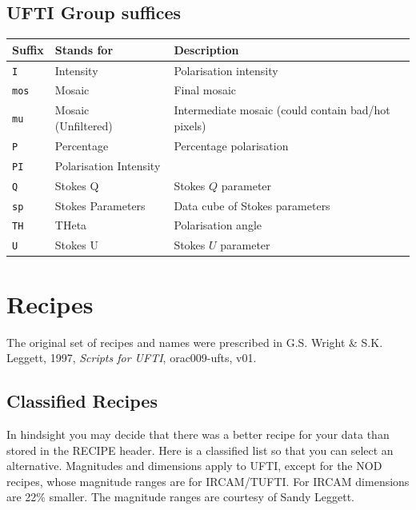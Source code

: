 \documentclass[twoside,11pt]{article}
\newcommand{\htmladdnormallink}[2]{#1}
\newcommand{\xlabel}[1]{}
\renewcommand{\_}{\texttt{\symbol{95}}}
\begin{document}
\subsection*{UFTI Group suffices}%
\begin{tabular}{llp{80mm}}
\hline
  Suffix   & Stands for             & Description \\ \hline
{\tt\_I}   & Intensity              & Polarisation intensity \\
{\tt\_mos} & Mosaic                 & Final mosaic \\
{\tt\_mu}  & Mosaic (Unfiltered)~~~ & Intermediate mosaic (could contain
                                      bad/hot pixels) \\
{\tt\_P}   & Percentage             & Percentage polarisation \\
{\tt\_PI}  & Polarisation Intensity & \\
{\tt\_Q}   & Stokes Q               & Stokes $Q$ parameter \\
{\tt\_sp}  & Stokes Parameters      & Data cube of Stokes parameters \\
{\tt\_TH}  & THeta                  & Polarisation angle \\
{\tt\_U}   & Stokes U               & Stokes $U$ parameter \\
\end{tabular}

\newpage
\section{\xlabel{recipes}Recipes\label{recipes}}

The original set of recipes and names were prescribed in
G.S. Wright \& S.K. Leggett, 1997, {\em Scripts for UFTI}, 
\htmladdnormallink{orac009-ufts, v01}
{http://www.jach.hawaii.edu/JACpublic/UKIRT/software/orac/docs/orac009-ufts-1.html}.

\subsection{\xlabel{classified_recipes}Classified Recipes}

In hindsight you may decide that there was a better recipe for your
data than stored in the RECIPE header.  Here is a classified list so
that you can select an alternative.  Magnitudes and dimensions
apply to UFTI, except for the NOD recipes, whose magnitude ranges
are for IRCAM/TUFTI.  For IRCAM dimensions are 22\% smaller.  The
magnitude ranges are courtesy of Sandy Leggett.
\bigskip\bigskip
\end{document}
